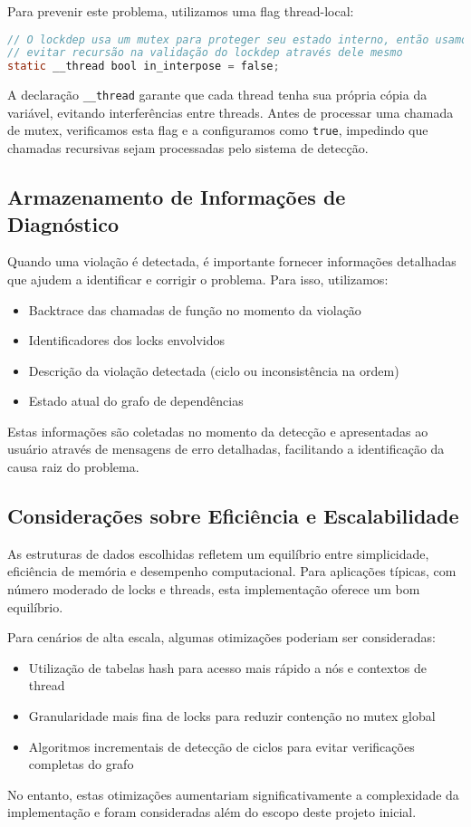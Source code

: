 Para prevenir este problema, utilizamos uma flag thread-local:

\begin{lstlisting}[language=C, caption={Flag de prevenção de recursão}]
// O lockdep usa um mutex para proteger seu estado interno, então usamos isto para
// evitar recursão na validação do lockdep através dele mesmo
static __thread bool in_interpose = false;
\end{lstlisting}

A declaração \texttt{\_\_thread} garante que cada thread tenha sua própria cópia da variável, evitando interferências entre threads. Antes de processar uma chamada de mutex, verificamos esta flag e a configuramos como \texttt{true}, impedindo que chamadas recursivas sejam processadas pelo sistema de detecção.

\subsection{Armazenamento de Informações de Diagnóstico}

Quando uma violação é detectada, é importante fornecer informações detalhadas que ajudem a identificar e corrigir o problema. Para isso, utilizamos:

\begin{itemize}
    \item Backtrace das chamadas de função no momento da violação
    \item Identificadores dos locks envolvidos
    \item Descrição da violação detectada (ciclo ou inconsistência na ordem)
    \item Estado atual do grafo de dependências
\end{itemize}

Estas informações são coletadas no momento da detecção e apresentadas ao usuário através de mensagens de erro detalhadas, facilitando a identificação da causa raiz do problema.

\subsection{Considerações sobre Eficiência e Escalabilidade}

As estruturas de dados escolhidas refletem um equilíbrio entre simplicidade, eficiência de memória e desempenho computacional. Para aplicações típicas, com número moderado de locks e threads, esta implementação oferece um bom equilíbrio.

Para cenários de alta escala, algumas otimizações poderiam ser consideradas:
\begin{itemize}
    \item Utilização de tabelas hash para acesso mais rápido a nós e contextos de thread
    \item Granularidade mais fina de locks para reduzir contenção no mutex global
    \item Algoritmos incrementais de detecção de ciclos para evitar verificações completas do grafo
\end{itemize}

No entanto, estas otimizações aumentariam significativamente a complexidade da implementação e foram consideradas além do escopo deste projeto inicial.
